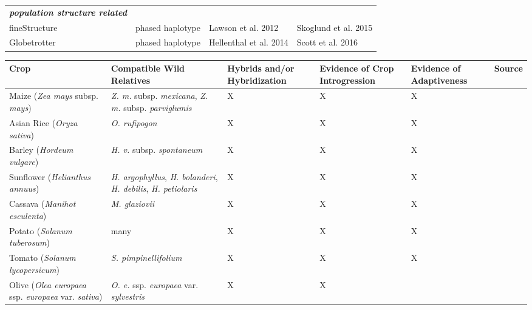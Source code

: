 \documentclass[11pt]{article}
\begin{document}
\begin{table}
\begin{center}
\begin{tabular}{llll}

\rowcolor{white}
{\emph{\bf population structure related}} &   &   &   \\
\rowcolor{white}
fineStructure &	phased haplotype &	Lawson et al. 2012	& Skoglund et al. 2015 \\
\rowcolor{white}
Globetrotter &	phased haplotype &	Hellenthal et al. 2014 & Scott et al. 2016 \\
\end{tabular}
\end{center}
\end{table} 





\begin{table}
\centering
\begin{adjustbox}{width=1\textwidth}
\small
\label{my-label}
\begin{tabular}{|p{5cm}|p{5cm}|p{2.6cm}|p{2.6cm}|p{2.6cm}|l|}
\hline
Crop & Compatible Wild Relatives & Hybrids and/or Hybridization & Evidence of Crop Introgression & Evidence of Adaptiveness & Source \\ \hline \hline
Maize (\emph{Zea mays} subsp. \emph{mays}) & \emph{Z. m.} subsp. \emph{mexicana}, \emph{Z. m. } subsp. \emph{parviglumis} & X & X & X & \cite{hufford2013genomic} \\ 
\hline 
Asian Rice (\emph{Oryza sativa}) & \emph{O. rufipogon} & X & X & X & \cite{Huang2012} \\ 
\hline
Barley (\emph{Hordeum vulgare}) & \emph{H. v.} subsp. \emph{spontaneum} & X & X & X & \cite{Poets2015} \\ \hline
Sunflower (\emph{Helianthus annuus}) & \emph{H. argophyllus}, \emph{H. bolanderi}, \emph{H. debilis}, \emph{H. petiolaris} & X & X & X & \cite{rieseberg2007hybridization}\\ 
\hline
Cassava (\emph{Manihot esculenta}) & \emph{M. glaziovii} & X & X & X & \cite{bredeson2016sequencing} \\ 
\hline
Potato (\emph{Solanum tuberosum}) & many & X & X & X & \cite{johns1986ongoing, gavrilenko2013genetic} \\
\hline
Tomato (\emph{Solanum lycopersicum}) & \emph{S. pimpinellifolium} & X & X & X & \cite{rick1958role} \\
\hline
Olive (\emph{Olea europaea} ssp. \emph{europaea} var. \emph{sativa}) & \emph{O. e.} ssp. \emph{europaea} var. \emph{sylvestris} & X & X & & \cite{diez2015olive} \\ 

\end{tabular}
\end{adjustbox}
\end{table}
\end{document}
